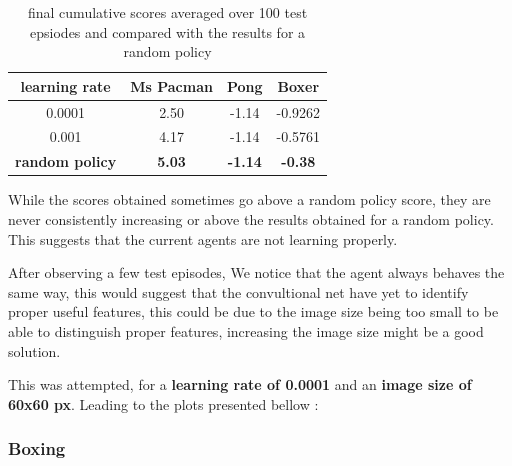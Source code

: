\documentclass{report}
\begin{document}
\begin{table}[H]
\centering
\label{b4Tab}
\begin{tabular}{|c|c|c|c|}
\hline
learning rate & Ms Pacman & Pong & Boxer \\ \hline
0.0001  & 2.50 & -1.14 & -0.9262 \\ \hline
0.001  & 4.17 & -1.14 & -0.5761 \\ \hline
\textbf{random policy} & \textbf{5.03} & \textbf{-1.14} & \textbf{-0.38}  \\ \hline
\end{tabular}


\caption{final cumulative scores averaged over 100 test epsiodes and compared with the results for a random policy }
\end{table}

While the scores obtained sometimes go above a random policy score, they are never consistently increasing or above the results obtained for a random policy. This suggests that the current agents are not learning properly. 

After observing a few test episodes, We notice that the agent always behaves the same way, this would suggest that the convultional net have yet to identify proper useful features, this could be due to the image size being too small to be able to distinguish proper features, increasing the image size might be a good solution. 

This was attempted, for a \textbf{learning rate of 0.0001} and an \textbf{image size of 60x60 px}. Leading to the plots presented bellow : 


\subsubsection*{Boxing}
\end{document}
